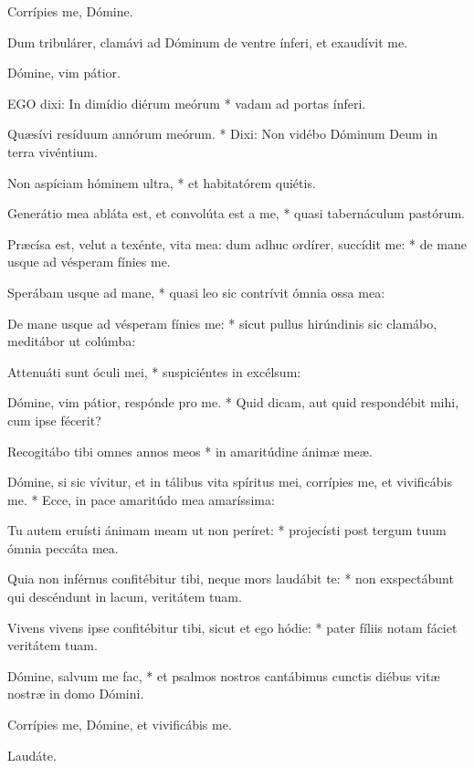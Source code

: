  Corrípies me, Dómine.


 Dum tribulárer, clamávi ad Dóminum de ventre ínferi, et exaudívit me.

 Dómine, vim pátior.


\lettrine[lines=2]{E}{GO} dixi: In dimídio diérum meórum * vadam ad portas ínferi.

Quæsívi resíduum annórum meórum. * Dixi: Non vidébo Dóminum Deum in terra vivéntium.

Non aspíciam hóminem ultra, * et habitatórem quiétis.

Generátio mea abláta est, et convolúta est a me, * quasi tabernáculum pastórum.

Præcísa est, velut a texénte, vita mea: dum adhuc ordírer, succídit me: * de mane usque ad vésperam fínies me.

Sperábam usque ad mane, * quasi leo sic contrívit ómnia ossa mea:

De mane usque ad vésperam fínies me: * sicut pullus hirúndinis sic clamábo, meditábor ut colúmba:

Attenuáti sunt óculi mei, * suspiciéntes in excélsum:

Dómine, vim pátior, respónde pro me. * Quid dicam, aut quid respondébit mihi, cum ipse fécerit?

Recogitábo tibi omnes annos meos * in amaritúdine ánimæ meæ.

Dómine, si sic vívitur, et in tálibus vita spíritus mei, corrípies me, et vivificábis me. * Ecce, in pace amaritúdo mea amaríssima:

Tu autem eruísti ánimam meam ut non períret: * projecísti post tergum tuum ómnia peccáta mea.

Quia non inférnus confitébitur tibi, neque mors laudábit te: * non exspectábunt qui descéndunt in lacum, veritátem tuam.

Vivens vivens ipse confitébitur tibi, sicut et ego hódie: * pater fíliis notam fáciet veritátem tuam.

Dómine, salvum me fac, * et psalmos nostros cantábimus cunctis diébus vitæ nostræ in domo Dómini.

 Corrípies me, Dómine, et vivificábis me.

 Laudáte. \textdagger


